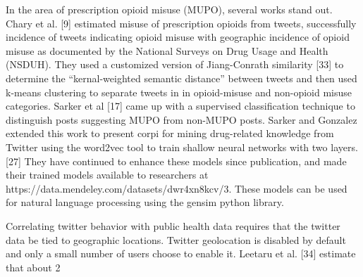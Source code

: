 \documentclass[sigconf]{acmart}
\begin{document}
In the area of prescription opioid misuse (MUPO), several works stand out. Chary et al. [9] estimated misuse of prescription opioids from tweets, successfully incidence of tweets indicating opioid misuse with geographic incidence of opioid misuse as documented by the National Surveys on Drug Usage and Health (NSDUH). They used a customized version of Jiang-Conrath similarity [33] to determine the “kernal-weighted semantic distance” between tweets and then used k-means clustering to separate tweets in in opioid-misuse and non-opioid misuse categories. Sarker et al [17] came up with a supervised classification technique to distinguish posts suggesting MUPO from non-MUPO posts. Sarker and Gonzalez extended this work to present corpi for mining drug-related knowledge from Twitter using the word2vec tool to train shallow neural networks with two layers. [27] They have continued to enhance these models since publication, and made their trained models available to researchers at https://data.mendeley.com/datasets/dwr4xn8kcv/3. These models can be used for natural language processing using the gensim python library.

Correlating twitter behavior with public health data requires that the twitter data be tied to geographic locations. Twitter geolocation is disabled by default and only a small number of users choose to enable it. Leetaru et al. [34] estimate that about 2%
\end{document}
